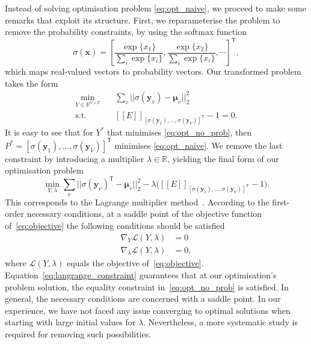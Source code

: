 \documentclass[acmsmall, review, anonymous]{acmart}\settopmatter{printfolios=true,printccs=false,printacmref=false}
\newcommand{\qqpi}[2]{[\![#2]\!]_{#1}}
\begin{document}
Instead of solving optimisation problem \eqref{eq:opt_naive}, we proceed to make some remarks that exploit its structure.
First, we reparameterise the problem to remove the probability constraints, by using the softmax function
\begin{equation}\label{eq:softmax}
	\sigma(\bm{x}) = \left[\frac{\exp\{x_1\}}{\sum_i \exp\{x_i\}}, \frac{\exp\{x_2\}}{\sum_i \exp\{x_i\}}, \cdots \right]^\mathsf{T},
\end{equation}
which maps real-valued vectors to probability vectors.
Our transformed problem takes the form
\begin{equation}
	\begin{aligned}\label{eq:opt_no_prob}
		\underset{Y \in \mathbb{R}^{V \times T}}{\mathrm{min}} & \quad
		\sum_v || \sigma(\bm{y}_v) - \bm{\mu}_v ||_2^2                                                                         \\
		\text{s.t. } & \quad
		\qqpi{[\sigma(\bm{y}_1), \ldots, \sigma(\bm{y}_{V})]^\mathsf{T}}{E} -1 = 0.
	\end{aligned}
\end{equation}
It is easy to see that for $Y^*$ that minimises \eqref{eq:opt_no_prob}, then
$P^* = [\sigma(\bm{y}_1), \ldots, \allowbreak \sigma(\bm{y}_{V})]^\mathsf{T}$
minimises \eqref{eq:opt_naive}.
% 
We remove the last constraint by introducing a multiplier $\lambda \in \mathbb{R}$, 
yielding the final form of our optimisation problem
\begin{equation}\label{eq:objective}
	\min_{Y, \lambda}
	\sum_v || \sigma(\bm{y}_v)^\mathsf{T} - \bm{\mu}_v ||_2^2
	- \lambda \big(\qqpi{[\sigma(\bm{y}_1), \ldots, \sigma(\bm{y}_{V})]^\mathsf{T}}{E} - 1\big).
\end{equation}
This corresponds to the Lagrange multiplier method~\citep{bertsekas82}.
According to the first-order necessary conditions, at a saddle point of the objective function of~\eqref{eq:objective} the following conditions should be satisfied
\begin{subequations}
\begin{align}
    \nabla_Y \mathcal{L}(Y, \lambda) & = 0\\
    \nabla_\lambda \mathcal{L}(Y, \lambda) & = 0,\label{eq:langrange_constraint}
\end{align}
\end{subequations}
where $\mathcal{L}(Y, \lambda)$ equals the objective of~\eqref{eq:objective}.
Equation~\eqref{eq:langrange_constraint} guarantees that at our optimisation's problem solution, the equality constraint in~\eqref{eq:opt_no_prob} is satisfied.
In general, the necessary conditions are concerned with a saddle point.
In our experience, we have not faced any issue converging to optimal solutions when starting with large initial values for $\lambda$.
Nevertheless, a more systematic study is required for removing such possibilities.
\end{document}
